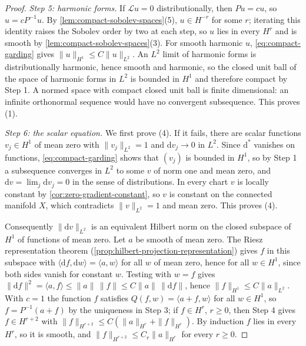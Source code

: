 \begin{proof}
\emph{Step 5: harmonic forms.} If $\mathcal Lu=0$ distributionally, then $Pu=cu$, so $u=cP^{-1}u$. By \cref{lem:compact-sobolev-spaces}(5), $u\in H^{-r}$ for some $r$; iterating this identity raises the Sobolev order by two at each step, so $u$ lies in every $H^r$ and is smooth by \cref{lem:compact-sobolev-spaces}(3). For smooth harmonic $u$, \eqref{eq:compact-garding} gives $\|u\|_{H^1}\leq C\|u\|_{L^2}$. An $L^2$ limit of harmonic forms is distributionally harmonic, hence smooth and harmonic, so the closed unit ball of the space of harmonic forms in $L^2$ is bounded in $H^1$ and therefore compact by Step 1. A normed space with compact closed unit ball is finite dimensional: an infinite orthonormal sequence would have no convergent subsequence. This proves (1).

\emph{Step 6: the scalar equation.} We first prove (4). If it fails, there are scalar functions $v_j\in H^1$ of mean zero with $\|v_j\|_{L^2}=1$ and $\mathrm dv_j\to0$ in $L^2$. Since $\mathrm d^*$ vanishes on functions, \eqref{eq:compact-garding} shows that $(v_j)$ is bounded in $H^1$, so by Step 1 a subsequence converges in $L^2$ to some $v$ of norm one and mean zero, and $\mathrm dv=\lim_j\mathrm dv_j=0$ in the sense of distributions. In every chart $v$ is locally constant by \cref{cor:zero-gradient-constant}, so $v$ is constant on the connected manifold $X$, which contradicts $\|v\|_{L^2}=1$ and mean zero. This proves (4).

Consequently $\|\mathrm dv\|_{L^2}$ is an equivalent Hilbert norm on the closed subspace of $H^1$ of functions of mean zero. Let $a$ be smooth of mean zero. The Riesz representation theorem (\cref{prop:hilbert-projection-representation}) gives $f$ in this subspace with $\langle\mathrm df,\mathrm dw\rangle=\langle a,w\rangle$ for all $w$ of mean zero, hence for all $w\in H^1$, since both sides vanish for constant $w$. Testing with $w=f$ gives $\|\mathrm df\|^2=\langle a,f\rangle\leq\|a\|\,\|f\|\leq C\|a\|\,\|\mathrm df\|$, hence $\|f\|_{H^1}\leq C\|a\|_{L^2}$. With $c=1$ the function $f$ satisfies $Q(f,w)=\langle a+f,w\rangle$ for all $w\in H^1$, so $f=P^{-1}(a+f)$ by the uniqueness in Step 3; if $f\in H^r$, $r\geq0$, then Step 4 gives $f\in H^{r+2}$ with $\|f\|_{H^{r+2}}\leq C(\|a\|_{H^r}+\|f\|_{H^r})$. By induction $f$ lies in every $H^r$, so it is smooth, and $\|f\|_{H^{r+2}}\leq C_r\|a\|_{H^r}$ for every $r\geq0$.


\end{proof}
